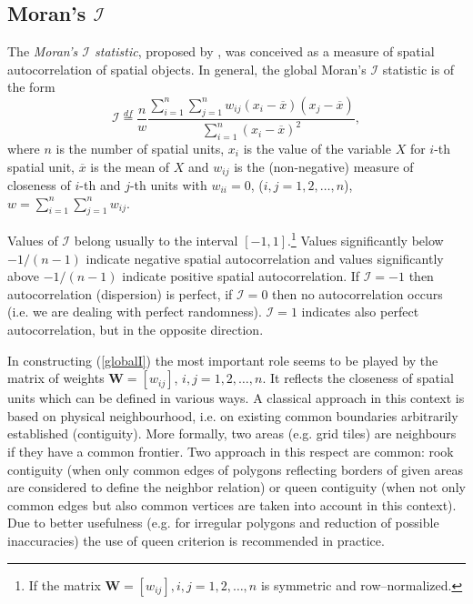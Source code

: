 \subsection{Moran's $\mathcal{I}$} \label{sec:util_moran}


The \emph{Moran's $\mathcal{I}$ statistic}, proposed by \cite{Moran1950}, was conceived as a measure of spatial autocorrelation of spatial objects. In general, the global Moran's $\mathcal{I}$ statistic is of the form
\begin{equation}
    \mathcal{I}\stackrel{df}{=}\frac{n}{w}\frac{\sum_{i=1}^n{\sum_{j=1}^n{w_{ij}(x_i-\overline{x})(x_j-\overline{x})}}}{\sum_{i=1}^n{(x_i-\overline{x})^2}},
\label{globalI}
\end{equation}
where $n$ is the number of spatial units, $x_i$ is the value of the variable $X$ for $i$-th spatial unit, $\overline{x}$ is the mean of $X$ and $w_{ij}$ is the (non-negative) measure of closeness of $i$-th and $j$-th units with $w_{ii}=0$, ($i,j=1,2,\ldots,n$), $w=\sum_{i=1}^n{\sum_{j=1}^n{w_{ij}}}$.

Values of $\mathcal{I}$ belong usually to the interval $[-1,1]$.\footnote{If the matrix $\mathbf{W}=[w_{ij}],i,j=1,2,\ldots,n$ is symmetric and row--normalized.} Values significantly below $-1/(n-1)$ indicate negative spatial autocorrelation and values significantly above $-1/(n-1)$ indicate positive spatial autocorrelation. If $\mathcal{I}=-1$ then autocorrelation (dispersion) is perfect, if $\mathcal{I}=0$ then no autocorrelation occurs (i.e. we are dealing with perfect randomness). $\mathcal{I}=1$ indicates also perfect autocorrelation, but in the opposite direction.

In constructing (\ref{globalI}) the most important role seems to be played by the matrix of weights $\mathbf{W}=[w_{ij}]$, $i,j=1,2,\ldots,n$. It reflects the closeness of spatial units which can be defined in various ways. A classical approach in this context is based on physical neighbourhood, i.e. on existing common boundaries arbitrarily established (contiguity). More formally, two areas (e.g. grid tiles) are neighbours if they have a common frontier. Two approach in this respect are common: rook contiguity (when only common edges of polygons reflecting borders of given areas are considered to define the neighbor relation) or queen contiguity (when not only common edges but also common vertices are taken into account in this context). Due to better usefulness (e.g. for irregular polygons and reduction of possible inaccuracies) the use of queen criterion is recommended in practice. 

